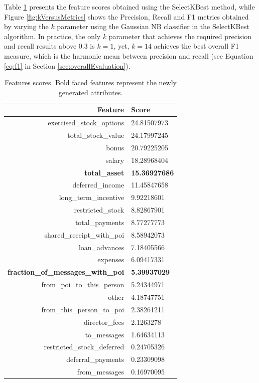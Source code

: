 \documentclass[11pt]{article}
\begin{document}
		Table \ref{tab:featureScores} presents the feature scores obtained using the SelectKBest method, while Figure \ref{fig:kVersusMetrics} shows the Precision, Recall and F1 metrics obtained by varying the $k$ parameter using the Gaussian NB classifier in the SelectKBest algorithm.
		In practice, the only $k$ parameter that achieves the required precision and recall results above $0.3$ is $k=1$, yet, $k=14$ achieves the best overall F1 measure, which is the harmonic mean between precision and recall (see Equation \ref{eq:f1} in Section \ref{sec:overallEvaluation}).
		
		\begin{table}
			\caption{Features scores. Bold faced features represent the newly generated attributes.}
			\begin{center}			
			\begin{tabular}{rl}
				\hline
				Feature & Score \\
				\hline
				exercised\_stock\_options & 24.81507973\\
				total\_stock\_value & 24.17997245\\
				bonus & 20.79225205\\
				salary & 18.28968404\\
				\textbf{total\_asset} & \textbf{15.36927686}\\
				deferred\_income & 11.45847658\\
				long\_term\_incentive & 9.92218601\\
				restricted\_stock & 8.82867901\\
				total\_payments & 8.77277773\\
				shared\_receipt\_with\_poi & 8.58942073\\
				loan\_advances & 7.18405566\\
				expenses & 6.09417331\\
				\textbf{fraction\_of\_messages\_with\_poi} & \textbf{5.39937029}\\
				from\_poi\_to\_this\_person & 5.24344971\\
				other & 4.18747751\\
				from\_this\_person\_to\_poi & 2.38261211\\
				director\_fees & 2.1263278\\
				to\_messages & 1.64634113\\
				restricted\_stock\_deferred & 0.24705326\\
				deferral\_payments & 0.23309098\\
				from\_messages & 0.16970095\\
			   	\hline
			\end{tabular}
			\end{center}			
			\label{tab:featureScores}
		\end{table}
\end{document}
